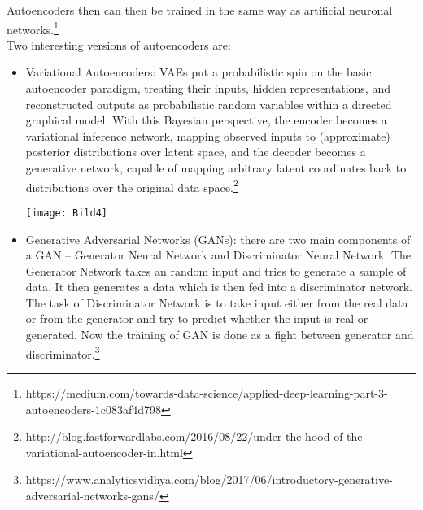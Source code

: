 \documentclass[12pt]{article}
\begin{document}
  Autoencoders then can then be trained in the same way as artificial neuronal networks.\footnote{https://medium.com/towards-data-science/applied-deep-learning-part-3-autoencoders-1c083af4d798}\\
  
  Two interesting versions of autoencoders are:
  
   \begin{itemize}
   	\item Variational Autoencoders: VAEs put a probabilistic spin on the basic autoencoder paradigm, treating their inputs, hidden representations, and reconstructed outputs as probabilistic random variables within a directed graphical model. With this Bayesian perspective, the encoder becomes a variational inference network, mapping observed inputs to (approximate) posterior distributions over latent space, and the decoder becomes a generative network, capable of mapping arbitrary latent coordinates back to distributions over the original data space.\footnote{http://blog.fastforwardlabs.com/2016/08/22/under-the-hood-of-the-variational-autoencoder-in.html}\
   	
   	\begin{center}
   		\texttt{[image: Bild4]}
   	\end{center}
   	
   	\item Generative Adversarial Networks (GANs): there are two main components of a GAN – Generator Neural Network and Discriminator Neural Network. The Generator Network takes an random input and tries to generate a sample of data. It then generates a data which is then fed into a discriminator network. The task of Discriminator Network is to take input either from the real data or from the generator and try to predict whether the input is real or generated. Now the training of GAN is done as a fight between generator and discriminator.\footnote{https://www.analyticsvidhya.com/blog/2017/06/introductory-generative-adversarial-networks-gans/}
   	
   	
\end{itemize}
  
  
  
\end{document}

